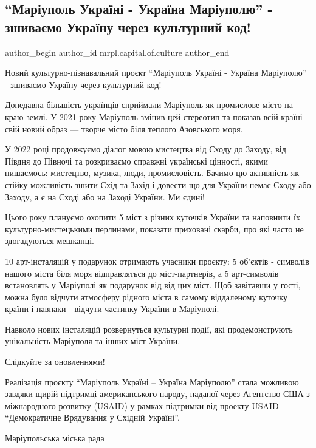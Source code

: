  
 
 
 
 

\subsection{\enquote{Маріуполь Україні - Україна Маріуполю} - зшиваємо Україну через культурний код!}
\label{sec:04_02_2022.fb.mrpl.capital.of.culture.1.mrpl2ua_kulturnyj_kod}

\ifcmt
 author_begin
   author_id mrpl.capital.of.culture
 author_end
\fi

Новий культурно-пізнавальний проєкт \enquote{Маріуполь Україні - Україна
Маріуполю} - зшиваємо Україну через культурний код!

Донедавна більшість українців сприймали Маріуполь як промислове місто на краю
землі. У 2021 року Маріуполь змінив цей стереотип та показав всій країні свій
новий образ — творче місто біля теплого Азовського моря.

У 2022 році продовжуємо діалог мовою мистецтва від Сходу до Заходу, від Півдня
до Півночі та розкриваємо справжні українські цінності, якими пишаємось:
мистецтво, музика, люди, промисловість. Бачимо цю активність як стійку
можливість зшити Схід та Захід і довести що для України немає Сходу або Заходу,
а є на Сході або на Заході України. Ми єдині!

Цього року плануємо охопити 5 міст з різних куточків України та наповнити їх
культурно-мистецькими перлинами, показати приховані скарби, про які часто не
здогадуються мешканці.

10 арт-інсталяцій у подарунок отримають учасники проєкту: 5 об'єктів - символів
нашого міста біля моря відправляться до міст-партнерів, а 5 арт-символів
встановлять у Маріуполі як подарунок від від цих міст. Щоб завітавши у гості,
можна було відчути атмосферу рідного міста в самому віддаленому куточку країни
і навпаки - відчути частинку України в Маріуполі.

Навколо нових інсталяцій розвернуться  культурні події, які продемонструють
унікальність Маріуполя та інших міст України.

Слідкуйте за оновленнями!

Реалізація проєкту \enquote{Маріуполь Україні – Україна Маріуполю} стала можливою
завдяки щирій підтримці американського народу, наданої через Агентство США з
міжнародного розвитку (USAID) у рамках підтримки від проекту USAID
\enquote{Демократичне Врядування у Східній Україні}.

Маріупольська міська рада
